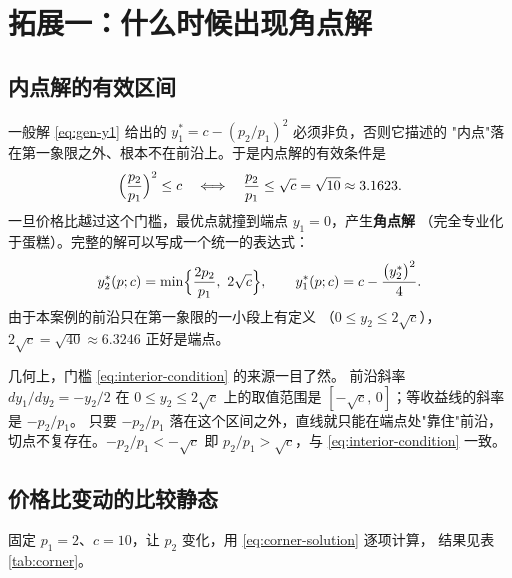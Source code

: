 
\section{拓展一：什么时候出现角点解}
\label{sec:corner}

\subsection{内点解的有效区间}

一般解 \eqref{eq:gen-y1} 给出的 $y_1^{*}=c-(p_2/p_1)^{2}$ 必须非负，否则它描述的
"内点"落在第一象限之外、根本不在前沿上。于是内点解的有效条件是
\begin{equation}
\Bigl(\frac{p_2}{p_1}\Bigr)^{2}\le c
\quad\Longleftrightarrow\quad
\frac{p_2}{p_1}\le \sqrt{c}=\sqrt{10}\approx 3.1623.
\label{eq:interior-condition}
\end{equation}
一旦价格比越过这个门槛，最优点就撞到端点 $y_1=0$，产生\textbf{角点解}
（完全专业化于蛋糕）。完整的解可以写成一个统一的表达式：
\begin{equation}
y_2^{*}(p;c)=\min\Bigl\{\frac{2p_2}{p_1},\ 2\sqrt{c}\Bigr\},
\qquad
y_1^{*}(p;c)=c-\frac{\bigl(y_2^{*}\bigr)^{2}}{4}.
\label{eq:corner-solution}
\end{equation}
由于本案例的前沿只在第一象限的一小段上有定义
（$0\le y_2\le 2\sqrt{c}$），
$2\sqrt{c}=\sqrt{40}\approx 6.3246$ 正好是端点。

几何上，门槛 \eqref{eq:interior-condition} 的来源一目了然。
前沿斜率 $dy_1/dy_2=-y_2/2$ 在 $0\le y_2\le 2\sqrt{c}$ 上的取值范围是
$[-\sqrt{c},\,0]$；等收益线的斜率是 $-p_2/p_1$。
只要 $-p_2/p_1$ 落在这个区间之外，直线就只能在端点处"靠住"前沿，
切点不复存在。$-p_2/p_1<-\sqrt{c}$ 即 $p_2/p_1>\sqrt{c}$，与 \eqref{eq:interior-condition} 一致。

\subsection{价格比变动的比较静态}

固定 $p_1=2$、$c=10$，让 $p_2$ 变化，用 \eqref{eq:corner-solution} 逐项计算，
结果见表 \ref{tab:corner}。


